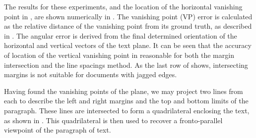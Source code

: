 
The results for these experiments, and the location of the horizontal vanishing
point in , are shown numerically in
. 
The vanishing point (VP) error is calculated as the relative distance of the
vanishing point from its ground truth, as described in . 
The angular error is derived from the final determined orientation of the
horizontal and vertical vectors of the text plane. 
It can be seen that the accuracy of location of the vertical vanishing point in
reasonable for both the margin intersection and the line spacings method. 
As the last row of  shows, intersecting margins is not
suitable for documents with jagged edges.


Having found the vanishing points of the plane, we may project two lines from each
to describe the left and right margins and the top and bottom limits of the paragraph.
These lines are intersected to form a quadrilateral enclosing the text,
as shown in . %
This quadrilateral is then used to recover a fronto-parallel viewpoint
of the paragraph of text.






